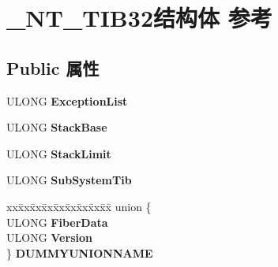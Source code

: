 \hypertarget{struct___n_t___t_i_b32}{}\section{\+\_\+\+N\+T\+\_\+\+T\+I\+B32结构体 参考}
\label{struct___n_t___t_i_b32}
\subsection*{Public 属性}
\begin{DoxyCompactItemize}
\item 
\mbox{\label{struct___n_t___t_i_b32_af9c63c0b53d38801c862c0b6d46c756b}} 
U\+L\+O\+NG {\bfseries Exception\+List}
\item 
\mbox{\label{struct___n_t___t_i_b32_aab3ad38dc365a6de3dce52cc01d6a117}} 
U\+L\+O\+NG {\bfseries Stack\+Base}
\item 
\mbox{\label{struct___n_t___t_i_b32_a599747b0ef6bddcb5208b750b2d8d77c}} 
U\+L\+O\+NG {\bfseries Stack\+Limit}
\item 
\mbox{\label{struct___n_t___t_i_b32_abc780eb4252cc98d6e3cbebb2c8ea14f}} 
U\+L\+O\+NG {\bfseries Sub\+System\+Tib}
\item 
\mbox{\label{struct___n_t___t_i_b32_a49d8d9f9f93b2a5b3151a23ce45ee416}} 
\begin{tabbing}
xx\=xx\=xx\=xx\=xx\=xx\=xx\=xx\=xx\=\kill
union \{\\
\>ULONG {\bfseries FiberData}\\
\>ULONG {\bfseries Version}\\
\} {\bfseries DUMMYUNIONNAME}\\


\end{tabbing}
\end{DoxyCompactItemize}
